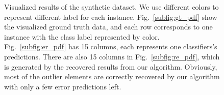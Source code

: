 \documentclass[10pt,twocolumn,letterpaper]{article}
\begin{document}
\begin{figure}[htp]
\center
    \caption{Visualized results of the synthetic dataset.
    We use different colors to represent different label for each instance.
   Fig.~\ref{subfig:gt_pdf} show the visualized ground truth data,
   and each row corresponds to one instance with the class label represented by color.
   Fig.~\ref{subfig:er_pdf} has 15 columns, each represents one classifiers's predictions.
   There are also 15 columns in Fig.~\ref{subfig:re_pdf}, which is generated by the recovered results from our algorithm.
    Obviously, most of the outlier elements are correctly recovered by our algorithm with only a few error predictions left.
    }
    \label{fig:ensemble_cluster}
\end{figure}
\end{document}
